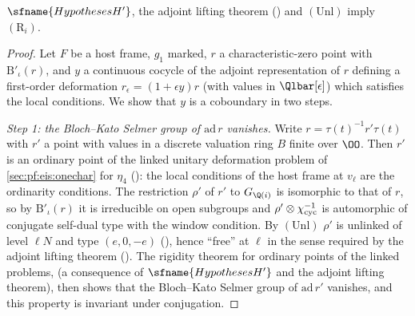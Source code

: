 \begin{proposition}\label{pf:eis:rigi}
$\sfname{HypothesesH'}$, the adjoint lifting theorem
() and $(\mathrm{Unl})$ imply $(\mathrm{R}_i)$.
\end{proposition}

\begin{proof}
Let $F$ be a host frame, $g_1$ marked, $r$ a characteristic-zero point with $\mathrm B'_\iota(r)$, and $y$ a continuous cocycle of the adjoint
representation of $r$ defining a first-order deformation $r_\epsilon=(1+\epsilon y)r$ (with values in $\Qlbar[\epsilon]$) which satisfies the local
conditions. We show that $y$ is a coboundary in two steps.

\emph{Step 1: the Bloch--Kato Selmer group of $\mathrm{ad}\,r$ vanishes.} Write $r=\tau(t)^{-1}r'\tau(t)$ with $r'$ a point with values in a discrete
valuation ring $B$ finite over $\OO$. Then $r'$ is an ordinary point of the linked unitary deformation problem of
\cref{sec:pf:eis:onechar} for $\eta_4$ (): the local conditions of the host
frame at $v_\ell$ are the ordinarity conditions. The restriction $\rho'$ of $r'$ to $G_{\Q(i)}$ is isomorphic to that of $r$, so by
$\mathrm B'_\iota(r)$ it is irreducible on open subgroups and $\rho'\otimes\chi_{\mathrm{cyc}}^{-1}$ is automorphic of conjugate self-dual type with the
window condition. By $(\mathrm{Unl})$ $\rho'$ is unlinked of level $\ell N$ and type $(e,0,-e)$
(), hence ``free'' at $\ell$ in the sense required by the adjoint lifting theorem
(). The rigidity theorem for ordinary points of the linked problems,
 (a consequence of $\sfname{HypothesesH'}$ and the adjoint lifting theorem), then shows that the
Bloch--Kato Selmer group of $\mathrm{ad}\,r'$ vanishes, and this property is invariant under conjugation.


\end{proof}
